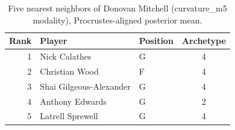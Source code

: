 \begin{table}[htbp]
  \centering\small
  \begin{tabular}{rllc}
    \toprule
    Rank & Player & Position & Archetype \\
    \midrule
    1 & Nick Calathes & G & 4 \\
    2 & Christian Wood & F & 4 \\
    3 & Shai Gilgeous-Alexander & G & 4 \\
    4 & Anthony Edwards & G & 2 \\
    5 & Latrell Sprewell & G & 4 \\
    \bottomrule
  \end{tabular}
  \caption{Five nearest neighbors of Donovan Mitchell (curvature_m5 modality), Procrustes-aligned posterior mean.}
  \label{tab:Donovan_Mitchell_neighbors_curvature_m5}
\end{table}

